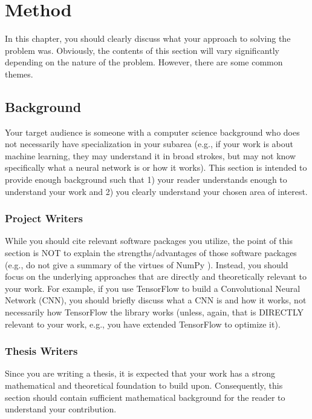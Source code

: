 \chapter{Method}

In this chapter, you should clearly discuss what your approach to solving the problem was.  Obviously, the contents of this section will vary significantly depending on the nature of the problem.  However, there are some common themes.

\section{Background}

Your target audience is someone with a computer science background who does not necessarily have specialization in your subarea (e.g., if your work is about machine learning, they may understand it in broad strokes, but may not know specifically what a neural network is or how it works).  This section is intended to provide enough background such that 1) your reader understands enough to understand your work and 2) you clearly understand your chosen area of interest.

\subsection{Project Writers}
While you should cite relevant software packages you utilize, the point of this section is NOT to explain the strengths/advantages of those software packages (e.g., do not give a summary of the virtues of NumPy \cite{harris2020array}).  Instead, you should focus on the underlying approaches that are directly and theoretically relevant to your work.  For example, if you use TensorFlow \cite{tensorflow2015-whitepaper} to build a Convolutional Neural Network (CNN), you should briefly discuss what a CNN is and how it works, not necessarily how TensorFlow the library works (unless, again, that is DIRECTLY relevant to your work, e.g., you have extended TensorFlow to optimize it).

\subsection{Thesis Writers}
Since you are writing a thesis, it is expected that your work has a strong mathematical and theoretical foundation to build upon.  Consequently, this section should contain sufficient mathematical background for the reader to understand your contribution.

